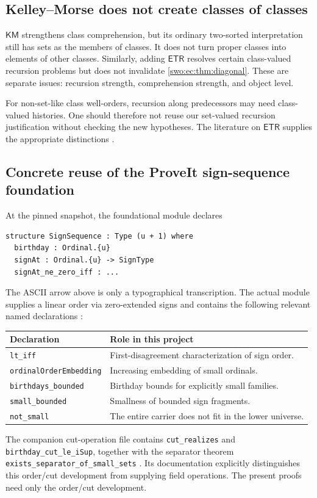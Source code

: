\documentclass[11pt]{article}
\theoremstyle{definition}
\theoremstyle{remark}
\newcommand{\KM}{\mathsf{KM}}
\newcommand{\ETR}{\mathsf{ETR}}
\begin{document}
\subsection{Kelley--Morse does not create classes of classes}
$\KM$ strengthens class comprehension, but its ordinary two-sorted
interpretation still has sets as the members of classes. It does not
turn proper classes into elements of other classes. Similarly, adding
$\ETR$ resolves certain class-valued recursion problems but does not
invalidate \cref{swo:ec:thm:diagonal}. These are separate issues: recursion
strength, comprehension strength, and object level.

For non-set-like class well-orders, recursion along predecessors may
need class-valued histories. One should therefore not reuse our
set-valued recursion justification without checking the new hypotheses.
The literature on $\ETR$ supplies the appropriate distinctions
\cite{GHHSW,HamkinsRecursion}.

\subsection{Concrete reuse of the ProveIt sign-sequence foundation}
At the pinned snapshot, the foundational module declares
\begin{verbatim}
structure SignSequence : Type (u + 1) where
  birthday : Ordinal.{u}
  signAt : Ordinal.{u} -> SignType
  signAt_ne_zero_iff : ...
\end{verbatim}
The ASCII arrow above is only a typographical transcription. The
actual module supplies a linear order via zero-extended signs and
contains the following relevant named declarations \cite{ProveItSigns}:
\begin{center}
\begin{tabularx}{\textwidth}{@{}lY@{}}
\toprule
Declaration & Role in this project\\
\midrule
\texttt{lt\_iff} & First-disagreement characterization of sign order.\\
\texttt{ordinalOrderEmbedding} & Increasing embedding of small ordinals.\\
\texttt{birthdays\_bounded} & Birthday bounds for explicitly small families.\\
\texttt{small\_bounded} & Smallness of bounded sign fragments.\\
\texttt{not\_small} & The entire carrier does not fit in the lower universe.\\
\bottomrule
\end{tabularx}
\end{center}
The companion cut-operation file contains \texttt{cut\_realizes} and
\texttt{birthday\_cut\_le\_iSup}, together with the separator theorem
\texttt{exists\_separator\_of\_small\_sets} \cite{ProveItCuts}. Its documentation
explicitly distinguishes this order/cut development from supplying field
operations. The present proofs need only the order/cut development.
\end{document}
